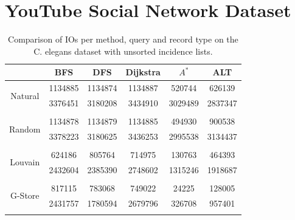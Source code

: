 \section*{YouTube Social Network Dataset}
\begin{table}[H]
	\begin{center}
		 \begin{tabular}[c]{c c c c c c} \toprule
			  & BFS & DFS & Dijkstra & $A^*$  & ALT \\ \midrule 
 			\multirow{2}{*}{Natural}  & 1134885 & 1134874 & 1134887 & 520744 & 626139 \\ 
 				 & 3376451 & 3180208 & 3434910 & 3029489 & 2837347 \\ 
 				&&&&& \\[-0.5em]
 			\multirow{2}{*}{Random}  & 1134878 & 1134879 & 1134885 & 494930 & 900538 \\ 
 				 & 3378223 & 3180625 & 3436253 & 2995538 & 3134437 \\ 
 				&&&&& \\[-0.5em]
 			\multirow{2}{*}{Louvain}  & 624186 & 805764 & 714975 & 130763 & 464393 \\ 
 				 & 2432604 & 2385390 & 2748602 & 1315246 & 1918687 \\ 
 				&&&&& \\[-0.5em]
 			\multirow{2}{*}{G-Store}  & 817115 & 783068 & 749022 & 24225 & 128005 \\ 
 				 & 2431757 & 1780594 & 2679796 & 326708 & 957401 \\ 
 				&&&&& \\[-0.5em]
 					\end{tabular}  
  	 \end{center}
	 \caption{Comparison of IOs per method, query and record type on the C. elegans dataset with unsorted incidence lists.}
	 \label{yt-uns}
\end{table}

